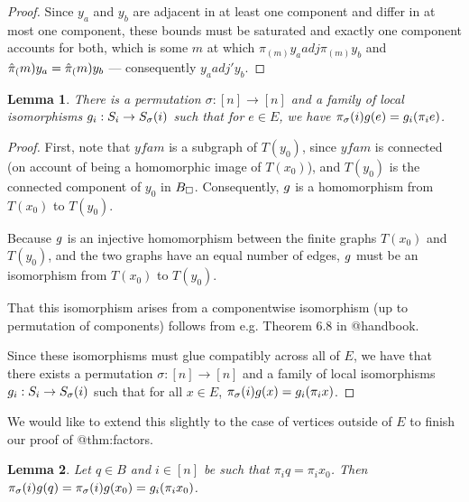 \documentclass{amsart}
\newtheorem{lemma}{Lemma}
\theoremstyle{definition}
\begin{document}
\begin{proof}
    Since $y_a$ and $y_b$ are adjacent in at least one component and differ in at most one component, these bounds must be saturated and exactly one component accounts for both, which is some $m$ at which $\pi_(m) y_a adj \pi_(m) y_b$ and $\hat{\pi}_(m) y_a = \hat{\pi}_(m) y_b$ --- consequently $y_a adj' y_b$.  
\end{proof}

\begin{lemma}
    There is a permutation $\sigma: [n]\to[n]$ and a family of local isomorphisms $g_i : S_i \to S_\sigma(i)$ such that for $e \in E$, we have $\pi_\sigma(i) g(e) = g_i (\pi_i e)$.
\end{lemma}

\begin{proof}
    First, note that $yfam$ is a subgraph of $T(y_0)$, since $yfam$ is connected (on account of being a homomorphic image of $T(x_0)$), and $T(y_0)$ is the connected component of $y_0$ in $B_\square$. Consequently, $g$ is a homomorphism from $T(x_0)$ to $T(y_0)$.

Because $g$ is an injective homomorphism between the finite graphs $T(x_0)$
and $T(y_0)$, and the two graphs have an equal number of edges, $g$ must be an isomorphism from $T(x_0)$ to $T(y_0)$.

That this isomorphism arises from a componentwise isomorphism (up to permutation of components) follows from e.g. Theorem 6.8 in @handbook.

Since these isomorphisms must glue compatibly across all of $E$, we have that there exists a permutation $\sigma : [n] \to [n]$ and a family of local isomorphisms $g_i : S_i \to S_\sigma(i)$ such that for all $x \in E$, $\pi_\sigma(i) g(x) = g_i (\pi_i x)$.

\end{proof}

We would like to extend this slightly to the case of vertices outside of $E$ to finish our proof of @thm:factors.

\begin{lemma}
    Let $q \in B$ and $i \in [n]$ be such that $\pi_i q = \pi_i x_0$. Then $\pi_\sigma(i) g(q) = \pi_\sigma(i) g(x_0) = g_i (\pi_i x_0)$.
\end{lemma}
\end{document}

